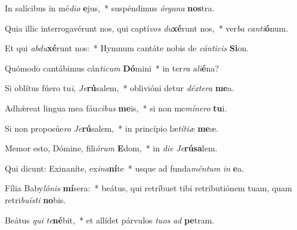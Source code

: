 \item In salícibus in mé\textit{di}\textit{o} \textbf{e}jus,~* suspéndimus \textit{ór}\textit{ga}\textit{na} \textbf{nos}tra.
\item Quia illic interrogavérunt nos, qui captí\textit{vos} \textit{du}\textbf{xé}runt nos,~* ver\textit{ba} \textit{can}\textit{ti}\textbf{ó}num.
\item Et qui \textit{ab}\textit{du}\textbf{xé}runt nos:~* Hymnum cantáte nobis de \textit{cán}\textit{ti}\textit{cis} \textbf{Si}on.
\item Quómodo cantábimus cán\textit{ti}\textit{cum} \textbf{Dó}mini~* in ter\textit{ra} \textit{a}\textit{li}\textbf{é}na?
\item Si oblítus fúero tu\textit{i}, \textit{Je}\textbf{rú}salem,~* oblivióni detur \textit{déx}\textit{te}\textit{ra} \textbf{me}a.
\item Adhǽreat lingua mea fáu\textit{ci}\textit{bus} \textbf{me}is,~* si non me\textit{mí}\textit{ne}\textit{ro} \textbf{tu}i.
\item Si non proposúe\textit{ro} \textit{Je}\textbf{rú}salem,~* in princípio læ\textit{tí}\textit{ti}\textit{æ} \textbf{me}æ.
\item Memor esto, Dómine, fili\textit{ó}\textit{rum} \textbf{E}dom,~* in \textit{di}\textit{e} \textit{Je}\textbf{rú}\textbf{sa}lem.
\item Qui dicunt: Exinaníte, ex\textit{i}\textit{na}\textbf{ní}te~* usque ad funda\textit{mén}\textit{tum} \textit{in} \textbf{e}a.
\item Fília Baby\textit{ló}\textit{nis} \textbf{mí}sera:~* beátus, qui retríbuet tibi retributiónem tuam, quam retri\textit{bu}\textit{ís}\textit{ti} \textbf{no}bis.
\item Beátus \textit{qui} \textit{te}\textbf{né}bit,~* et allídet párvulos \textit{tu}\textit{os} \textit{ad} \textbf{pe}tram.
